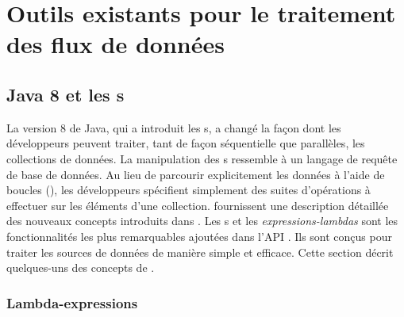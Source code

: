 
\chapter{Outils existants pour le traitement des flux de donn\'ees}
\label{outils_connus}






\section{Java 8 et les s}

La version 8 de Java, qui a introduit les s, a chang\'e la façon dont les d\'eveloppeurs peuvent traiter, tant de fa\c{c}on s\'equentielle que parall\`eles, les collections de donn\'ees. La manipulation des s ressemble \`a un langage de requ\^ete de base de donn\'ees. Au lieu de parcourir explicitement les donn\'ees \`a l'aide de boucles (), les d\'eveloppeurs sp\'ecifient simplement des suites d'op\'erations \`a effectuer sur les \'el\'ements d'une collection. \cite{urma2014java} fournissent une description d\'etaill\'ee des nouveaux concepts introduits dans . Les s et les \emph{expressions-lambdas} sont les fonctionnalit\'es les plus remarquables ajout\'ees dans l'API \citep{javaStreamAPI}. Ils sont con\c{c}us pour traiter les sources de donn\'ees de mani\`ere simple et efficace. Cette section d\'ecrit quelques-uns des concepts de .


\subsection{Lambda-expressions}

